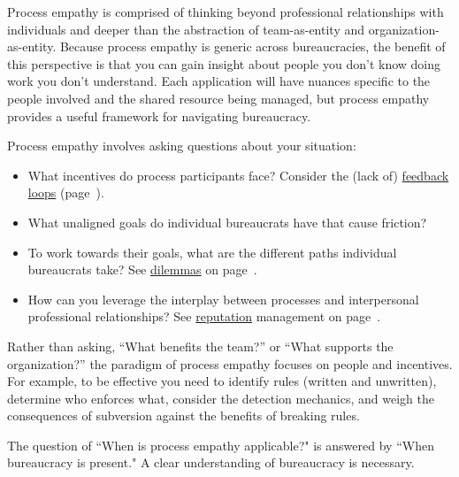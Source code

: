 Process empathy is comprised of thinking beyond professional relationships with individuals and deeper than the abstraction of team-as-entity and organization-as-entity. 
Because process empathy is generic across bureaucracies, the benefit of this perspective is that you can gain insight about people you don't know doing work you don't understand.
Each application will have nuances specific to the people involved and the shared resource being managed, but process empathy provides a useful framework for navigating bureaucracy.


Process empathy involves asking questions about your situation:
\begin{itemize}
    \item What incentives do process participants face?
Consider the (lack of) \hyperref[sec:feedback-loop-and-ripples]{feedback loops} (page~\pageref{sec:feedback-loop-and-ripples}).
    \item What unaligned goals do individual bureaucrats have that cause friction?
    \item To work towards their goals, what are the different paths individual bureaucrats take?
See \hyperref[sec:dilemma-trilemma]{dilemmas} on page~\pageref{sec:dilemma-trilemma}.
    \item How can you leverage the interplay between processes and interpersonal professional relationships?
See \hyperref[sec:reputation]{reputation} management on page~\pageref{sec:reputation}.
\end{itemize}

Rather than asking, ``What benefits the team?'' or ``What supports the organization?'' the paradigm of process empathy focuses on people and incentives. %
For example, to be effective you need to 
identify rules (written and unwritten), determine who enforces what, consider the detection mechanics, and weigh the consequences of subversion against the benefits of breaking rules.


The question of ``When is process empathy applicable?" is answered by ``When bureaucracy is present." A clear understanding of bureaucracy is necessary. 
